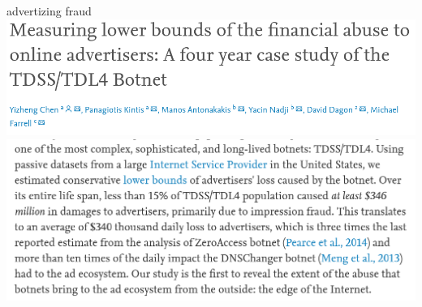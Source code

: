 { %
    \begin{frame}{advertizing fraud}
        \includegraphics[width=0.8\paperwidth]{../intro/tdss-cost-head}
        \includegraphics[width=0.8\paperwidth]{../intro/tdss-cost-low}
    \end{frame}
}
